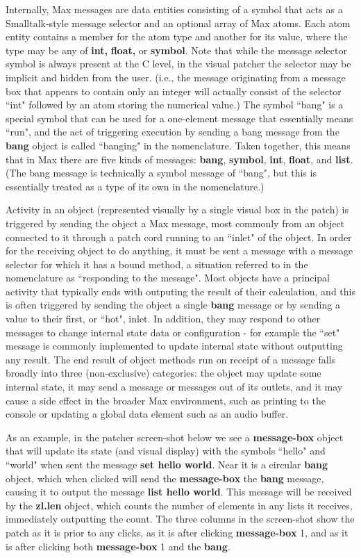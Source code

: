 \documentclass[acmsmall]{acmart}
\begin{document}
Internally, Max messages are data entities consisting of a symbol that acts
as a Smalltalk-style message selector and an optional array of Max atoms. 
Each atom entity contains a member for the atom type and another for its value, 
where the type may be any of \textbf{int,} \textbf{float,} or \textbf{symbol}. 
Note that while the message selector symbol is always present at the C level,
in the visual patcher the selector may be implicit and hidden from the user. 
(i.e., the message originating from a message box that appears to contain only an integer
will actually consist of the selector ``int" followed by an atom storing the numerical value.)
The symbol ``bang" is a special symbol that can be used for a one-element message 
that essentially means ``run", and the act of triggering execution by sending a bang
message from the \textbf{bang} object is called ``banging" in the nomenclature.
Taken together, this means that in Max there are five kinds of messages: 
\textbf{bang}, \textbf{symbol}, \textbf{int}, \textbf{float}, and \textbf{list}. 
(The bang message is technically a symbol message
of ``bang", but this is essentially treated as a type of its own in the nomenclature.) 

Activity in an object (represented visually by a single visual box in the patch) is triggered
by sending the object a Max message, most commonly from an object connected to it
through a patch cord running to an ``inlet" of the object. 
In order for the receiving object to do anything, it must 
be sent a message with a message selector for which it has a bound method,
a situation referred to in the nomenclature as ``responding to the message". Most objects
have a principal activity that typically ends with outputing the result of their calculation, and this is
often triggered by sending the object a single \textbf{bang} message or by sending a value to 
their first, or ``hot", inlet. In addition, they may respond to other messages to change internal state
data or configuration - for example the ``set" message is commonly implemented to update internal
state without outputting any result. The end result of object methods run on receipt of a message falls broadly
into three (non-exclusive) categories: the object may update some internal state, it may send a
message or messages out of its outlets, and it may cause a side effect in the broader
Max environment, such as printing to the console or updating a global data element such as
an audio buffer.

As an example, in the patcher screen-shot below we see a \textbf{message-box} object that will update
its state (and visual display) with the symbols ``hello" and ``world" when sent the message 
\textbf{set hello world}. Near it is a circular \textbf{bang} object, which when clicked will send the
\textbf{message-box} the \textbf{bang} message, causing it to output the message \textbf{list hello world}.
This message will be received by the \textbf{zl.len} object, which counts the number of elements 
in any lists it receives, immediately outputting the count. The three columns in the screen-shot
show the patch as it is prior to any clicks, as it is after clicking \textbf{message-box} 1,
and as it is after clicking both \textbf{message-box} 1 and the \textbf{bang}.
\end{document}
